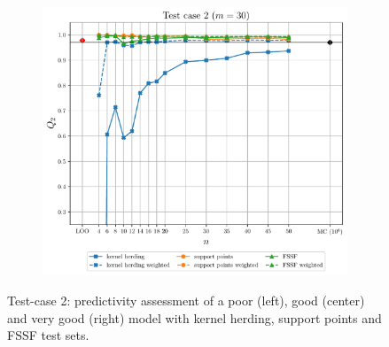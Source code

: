 \begin{landscape}
\begin{figure}
\begin{subfigure}[b]{0.32\linewidth}
        \end{subfigure}
        \centering
        \begin{subfigure}[b]{0.32\linewidth}
            \centering
            \includegraphics[width=\linewidth]{./part2/figures/SIS/cosin_learnsize_30.pdf}
        \end{subfigure}
        \caption{Test-case 2: predictivity assessment of a poor (left), good (center) and very good (right) model with kernel herding, support points and FSSF test sets.}
        \label{fig:cosin_benchmark}
    \end{figure}

\end{landscape}

